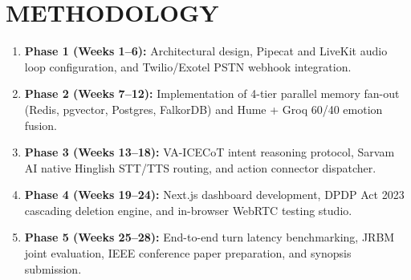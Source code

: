 \documentclass[12pt,a4paper]{article}
\begin{document}
\section{METHODOLOGY}
\begin{enumerate}
    \item \textbf{Phase 1 (Weeks 1--6):} Architectural design, Pipecat and LiveKit audio loop configuration, and Twilio/Exotel PSTN webhook integration.
    \item \textbf{Phase 2 (Weeks 7--12):} Implementation of 4-tier parallel memory fan-out (Redis, pgvector, Postgres, FalkorDB) and Hume + Groq 60/40 emotion fusion.
    \item \textbf{Phase 3 (Weeks 13--18):} VA-ICECoT intent reasoning protocol, Sarvam AI native Hinglish STT/TTS routing, and action connector dispatcher.
    \item \textbf{Phase 4 (Weeks 19--24):} Next.js dashboard development, DPDP Act 2023 cascading deletion engine, and in-browser WebRTC testing studio.
    \item \textbf{Phase 5 (Weeks 25--28):} End-to-end turn latency benchmarking, JRBM joint evaluation, IEEE conference paper preparation, and synopsis submission.
\end{enumerate}

\end{document}
